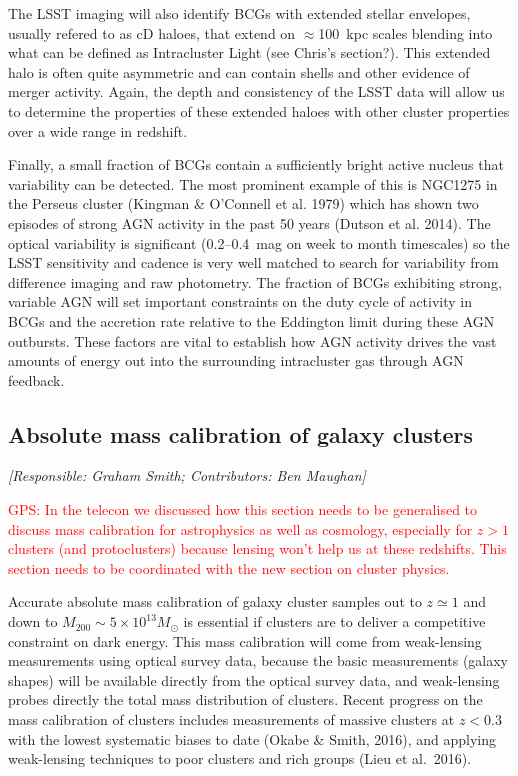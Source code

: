 \documentclass[a4paper,11pt]{article}
\newcommand{\red}{\textcolor{red}}
\begin{document}
The LSST imaging will also identify BCGs with extended stellar
envelopes, usually refered to as cD haloes, that extend on
$\approx$100~kpc scales blending into what can be defined as
Intracluster Light (see Chris's section?).  This extended halo is
often quite asymmetric and can contain shells and other evidence of
merger activity. Again, the depth and consistency of the LSST data
will allow us to determine the properties of these extended haloes
with other cluster properties over a wide range in redshift.

Finally, a small fraction of BCGs contain a sufficiently bright active
nucleus that variability can be detected. The most prominent example
of this is NGC1275 in the Perseus cluster (Kingman \& O'Connell et
al. 1979) which has shown two episodes of strong AGN activity in the
past 50 years (Dutson et al. 2014). The optical variability is
significant (0.2--0.4~mag on week to month timescales) so the LSST
sensitivity and cadence is very well matched to search for variability
from difference imaging and raw photometry. The fraction of BCGs
exhibiting strong, variable AGN will set important constraints on the
duty cycle of activity in BCGs and the accretion rate relative to the
Eddington limit during these AGN outbursts.  These factors are vital
to establish how AGN activity drives the vast amounts of energy out
into the surrounding intracluster gas through AGN feedback.

\subsection{Absolute mass calibration of galaxy clusters}\label{sec:mass}

{\it [Responsible: Graham Smith; Contributors: Ben Maughan]}

\noindent\red{GPS: In the telecon we discussed how this section needs
  to be generalised to discuss mass calibration for astrophysics as
  well as cosmology, especially for $z>1$ clusters (and protoclusters)
  because lensing won't help us at these redshifts.  This section
  needs to be coordinated with the new section on cluster physics.}

\noindent
Accurate absolute mass calibration of galaxy cluster samples out to
$z\simeq1$ and down to $M_{200}\sim5\times10^{13}M_\odot$ is essential
if clusters are to deliver a competitive constraint on dark energy.
This mass calibration will come from weak-lensing measurements using
optical survey data, because the basic measurements (galaxy shapes)
will be available directly from the optical survey data, and
weak-lensing probes directly the total mass distribution of clusters.
Recent progress on the mass calibration of clusters includes
measurements of massive clusters at $z<0.3$ with the lowest systematic
biases to date (Okabe \& Smith, 2016), and applying weak-lensing
techniques to poor clusters and rich groups (Lieu et al.\ 2016).
\end{document}
